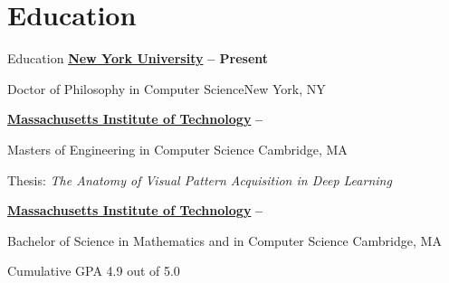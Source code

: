 
\section{Education}
{Education}
\href{http://nyu.edu}{\textbf{New York University}}
\hfill
\textbf{
--
Present}
\par
{Doctor of Philosophy in Computer Science}\hfill New York, NY

\EntryGap

\href{http://web.mit.edu}{\textbf{Massachusetts Institute of Technology}}
\hfill
\textbf{
--
}
\par
{Masters of Engineering in Computer Science}
\hfill Cambridge, MA
\par Thesis: \textit{The Anatomy of Visual Pattern Acquisition in Deep Learning}
\SmallEntryGap

\EntryGap

\href{http://web.mit.edu}{\textbf{Massachusetts Institute of Technology}}
\hfill
\textbf{
--
}
\par
{Bachelor of Science in Mathematics and in Computer Science}
\hfill Cambridge, MA
\par Cumulative GPA 4.9 out of 5.0











